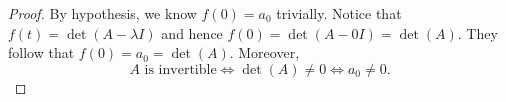 \begin{Exercise}
	\begin{proof}
		By hypothesis, we know $f(0) = a_0$ trivially. Notice that $f(t) = \det(A-\lambda I)$ and hence $f(0) = \det(A - 0 I) = \det(A)$. They follow that $f(0) = a_0 = \det(A)$. Moreover, 
		$$
		A\text{ is invertible}
		\iff \det(A)\neq 0
		\iff a_0\neq 0.
		$$
	\end{proof}
\end{Exercise}
